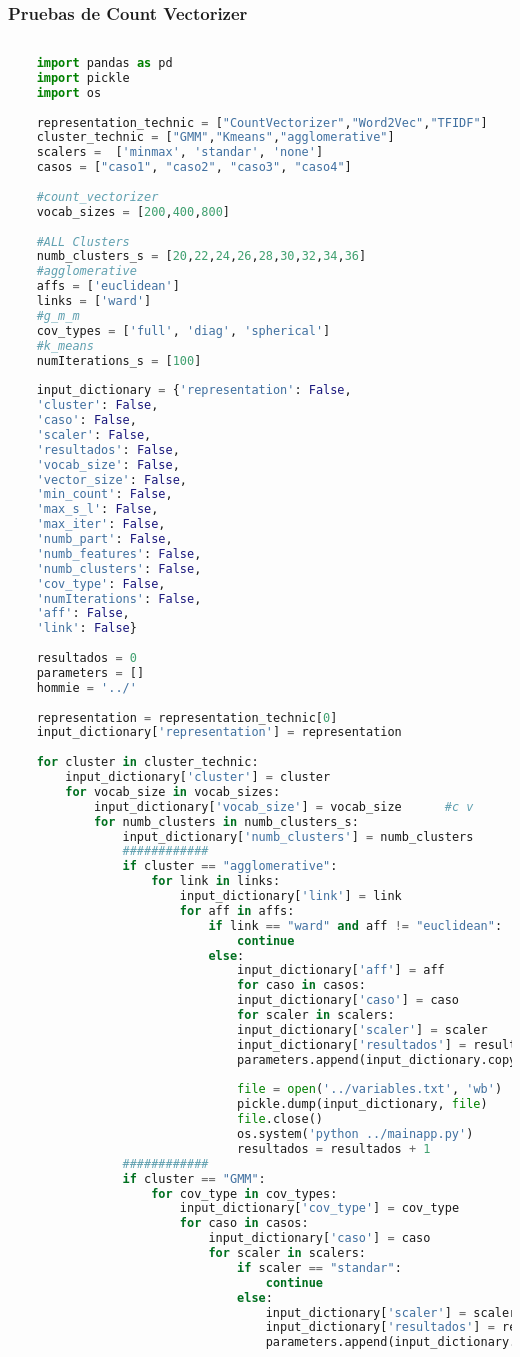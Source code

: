 \documentclass[12pt]{article}
\begin{document}
	\subsubsection*{Pruebas de Count Vectorizer}	
	\begin{lstlisting}[language=Python, 
	caption = Rutina de pruebas CountVectorizer,
	label={lst:pruebasCoVe}]
	
	import pandas as pd
	import pickle
	import os
	
	representation_technic = ["CountVectorizer","Word2Vec","TFIDF"]
	cluster_technic = ["GMM","Kmeans","agglomerative"]
	scalers =  ['minmax', 'standar', 'none']
	casos = ["caso1", "caso2", "caso3", "caso4"]
	
	#count_vectorizer
	vocab_sizes = [200,400,800]
	
	#ALL Clusters
	numb_clusters_s = [20,22,24,26,28,30,32,34,36]
	#agglomerative
	affs = ['euclidean']
	links = ['ward']
	#g_m_m
	cov_types = ['full', 'diag', 'spherical']
	#k_means
	numIterations_s = [100]
	
	input_dictionary = {'representation': False,
	'cluster': False,
	'caso': False,
	'scaler': False,
	'resultados': False,
	'vocab_size': False,
	'vector_size': False,
	'min_count': False,
	'max_s_l': False,
	'max_iter': False,
	'numb_part': False,
	'numb_features': False,
	'numb_clusters': False,
	'cov_type': False,
	'numIterations': False,
	'aff': False,
	'link': False}
	
	resultados = 0
	parameters = []
	hommie = '../'
	
	representation = representation_technic[0]
	input_dictionary['representation'] = representation
	
	for cluster in cluster_technic:
		input_dictionary['cluster'] = cluster
		for vocab_size in vocab_sizes:
			input_dictionary['vocab_size'] = vocab_size      #c v
			for numb_clusters in numb_clusters_s:
				input_dictionary['numb_clusters'] = numb_clusters
				############
				if cluster == "agglomerative":
					for link in links:
						input_dictionary['link'] = link
						for aff in affs:
							if link == "ward" and aff != "euclidean":
								continue
							else:
								input_dictionary['aff'] = aff                
								for caso in casos:
								input_dictionary['caso'] = caso
								for scaler in scalers:
								input_dictionary['scaler'] = scaler
								input_dictionary['resultados'] = resultados    
								parameters.append(input_dictionary.copy())                            
							
								file = open('../variables.txt', 'wb')
								pickle.dump(input_dictionary, file)
								file.close()
								os.system('python ../mainapp.py')
								resultados = resultados + 1 
				############
				if cluster == "GMM":
					for cov_type in cov_types:
						input_dictionary['cov_type'] = cov_type             
						for caso in casos:
							input_dictionary['caso'] = caso
							for scaler in scalers:
								if scaler == "standar":
									continue
								else:
									input_dictionary['scaler'] = scaler
									input_dictionary['resultados'] = resultados  
									parameters.append(input_dictionary.copy())     
					

\end{lstlisting}
\end{document}
